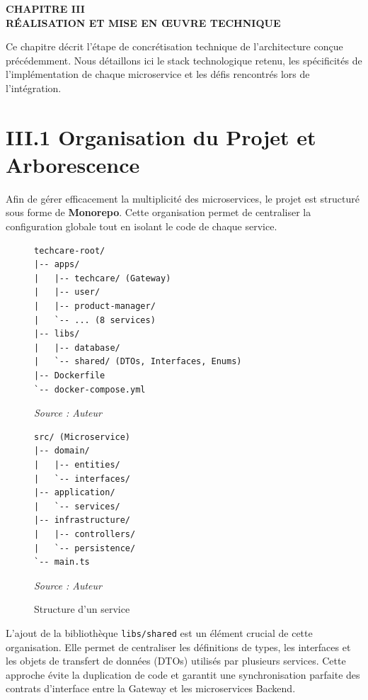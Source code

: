 \thispagestyle{normalpage}

\begin{center}
    \large \textbf{CHAPITRE III} \\[0.3em]
    \large \textbf{RÉALISATION ET MISE EN ŒUVRE TECHNIQUE}
\end{center}
\label{page:chapitre3}
\vspace{1cm}

Ce chapitre décrit l'étape de concrétisation technique de l'architecture conçue précédemment. Nous détaillons ici le stack technologique retenu, les spécificités de l'implémentation de chaque microservice et les défis rencontrés lors de l'intégration.

\section{III.1 Organisation du Projet et Arborescence}
Afin de gérer efficacement la multiplicité des microservices, le projet est structuré sous forme de \textbf{Monorepo}. Cette organisation permet de centraliser la configuration globale tout en isolant le code de chaque service.

\begin{figure}[htbp]
\begin{minipage}{0.48\textwidth}
\centering
\begin{verbatim}
techcare-root/
|-- apps/
|   |-- techcare/ (Gateway)
|   |-- user/
|   |-- product-manager/
|   `-- ... (8 services)
|-- libs/
|   |-- database/
|   `-- shared/ (DTOs, Interfaces, Enums)
|-- Dockerfile
`-- docker-compose.yml
\end{verbatim}
\caption{Structure globale (Monorepo)}
\vspace{0.2cm}\small\textit{Source : Auteur}
\end{minipage}
\hfill
\begin{minipage}{0.48\textwidth}
\centering
\begin{verbatim}
src/ (Microservice)
|-- domain/
|   |-- entities/
|   `-- interfaces/
|-- application/
|   `-- services/
|-- infrastructure/
|   |-- controllers/
|   `-- persistence/
`-- main.ts
\end{verbatim}
\caption{Structure d'un service}
\vspace{0.2cm}\small\textit{Source : Auteur}
\end{minipage}
\end{figure}

L'ajout de la bibliothèque \texttt{libs/shared} est un élément crucial de cette organisation. Elle permet de centraliser les définitions de types, les interfaces et les objets de transfert de données (DTOs) utilisés par plusieurs services. Cette approche évite la duplication de code et garantit une synchronisation parfaite des contrats d'interface entre la Gateway et les microservices Backend.

